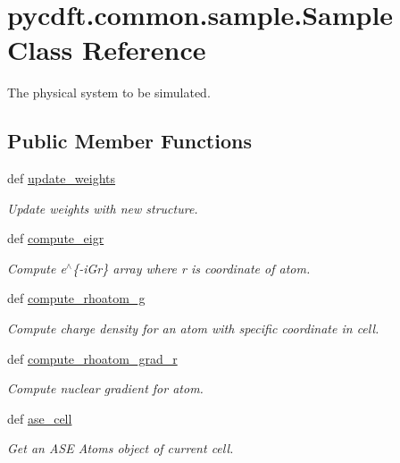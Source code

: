 \hypertarget{classpycdft_1_1common_1_1sample_1_1Sample}{\section{pycdft.\-common.\-sample.\-Sample Class Reference}
\label{classpycdft_1_1common_1_1sample_1_1Sample}
}


The physical system to be simulated.  


\subsection*{Public Member Functions}
\begin{DoxyCompactItemize}
\item 
def \hyperlink{classpycdft_1_1common_1_1sample_1_1Sample_a705c3964ef0f3f201095e09fbe199ef4}{update\-\_\-weights}
\begin{DoxyCompactList}\small\item\em Update weights with new structure. \end{DoxyCompactList}\item 
def \hyperlink{classpycdft_1_1common_1_1sample_1_1Sample_adf9951f7818d6cd9e2f419c5edc6b337}{compute\-\_\-eigr}
\begin{DoxyCompactList}\small\item\em Compute e$^\wedge$\{-\/i\-Gr\} array where r is coordinate of atom. \end{DoxyCompactList}\item 
def \hyperlink{classpycdft_1_1common_1_1sample_1_1Sample_a2b5b55047135cc67c2ed50b345442091}{compute\-\_\-rhoatom\-\_\-g}
\begin{DoxyCompactList}\small\item\em Compute charge density for an atom with specific coordinate in cell. \end{DoxyCompactList}\item 
def \hyperlink{classpycdft_1_1common_1_1sample_1_1Sample_a0c381597ca138f4a568d422b9635f51e}{compute\-\_\-rhoatom\-\_\-grad\-\_\-r}
\begin{DoxyCompactList}\small\item\em Compute nuclear gradient for atom. \end{DoxyCompactList}\item 
def \hyperlink{classpycdft_1_1common_1_1sample_1_1Sample_ae71e2360b4043d1bf559a2f066c94646}{ase\-\_\-cell}
\begin{DoxyCompactList}\small\item\em Get an A\-S\-E Atoms object of current cell. \end{DoxyCompactList}\item 

\end{DoxyCompactItemize}
